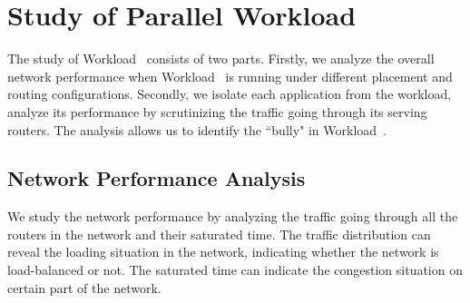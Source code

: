 
\section{Study of Parallel Workload~}
\label{sec:workload-1}

The study of Workload~ consists of two parts. Firstly, we analyze the overall network performance when Workload~ is running under different placement and routing configurations. Secondly, we isolate each application from the workload, analyze its performance by scrutinizing the traffic going through its serving routers. The analysis allows us to identify the ``bully" in Workload~. 



\subsection{Network Performance Analysis}
\label{sec: workload-1 network analysis}

We study the network performance by analyzing the traffic going through all the routers in the network and their saturated time. 
The traffic distribution can reveal the loading situation in the network, 
indicating whether the network is load-balanced or not. 
The saturated time can indicate the congestion situation on certain part of the network. 


